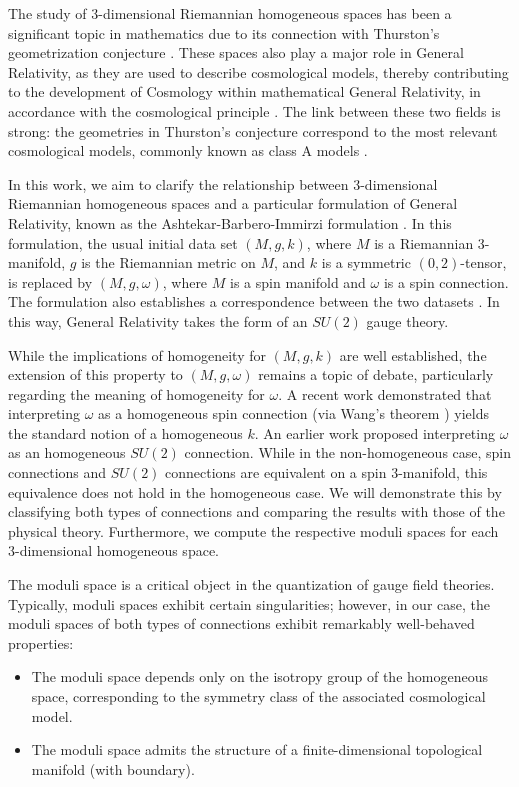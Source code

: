 \documentclass{article}
\numberwithin{equation}{section}
\theoremstyle{definition}
\begin{document}
The study of 3-dimensional Riemannian homogeneous spaces has been a significant topic in mathematics due to its connection with Thurston's geometrization conjecture \cite{Thurston_1982}. These spaces also play a major role in General Relativity, as they are used to describe cosmological models, thereby contributing to the development of Cosmology within mathematical General Relativity, in accordance with the cosmological principle \cite{Landau_Lifshits_1975}. The link between these two fields is strong: the geometries in Thurston's conjecture correspond to the most relevant cosmological models, commonly known as class A models \cite{Milnor_1976,Patrangenaru_1996}.

\medskip

In this work, we aim to clarify the relationship between 3-dimensional Riemannian homogeneous spaces and a particular formulation of General Relativity, known as the Ashtekar-Barbero-Immirzi formulation \cite{Ashtekar_1986,Ashtekar_1987,Barbero_1995,Immirzi_1997}. In this formulation, the usual initial data set $(M, g, k)$, where $M$ is a Riemannian 3-manifold, $g$ is the Riemannian metric on $M$, and $k$ is a symmetric $(0,2)$-tensor, is replaced by $(M, g, \omega)$, where $M$ is a spin manifold and $\omega$ is a spin connection. The formulation also establishes a correspondence between the two datasets \cite{Bruno_2024a}. In this way, General Relativity takes the form of an $SU(2)$ gauge theory.

\medskip

While the implications of homogeneity for $(M, g, k)$ are well established, the extension of this property to $(M, g, \omega)$ remains a topic of debate, particularly regarding the meaning of homogeneity for $\omega$. A recent work \cite{Bruno_2024b} demonstrated that interpreting $\omega$ as a homogeneous spin connection (via Wang's theorem \cite{Wang_1958}) yields the standard notion of a homogeneous $k$. An earlier work \cite{Bojowald_Kastrup_2000} proposed interpreting $\omega$ as an homogeneous $SU(2)$ connection. While in the non-homogeneous case, spin connections and $SU(2)$ connections are equivalent on a spin 3-manifold, this equivalence does not hold in the homogeneous case. We will demonstrate this by classifying both types of connections and comparing the results with those of the physical theory. Furthermore, we compute the respective moduli spaces for each 3-dimensional homogeneous space.

\medskip

The moduli space is a critical object in the quantization of gauge field theories. Typically, moduli spaces exhibit certain singularities; however, in our case, the moduli spaces of both types of connections exhibit remarkably well-behaved properties:
\begin{itemize}
    \item The moduli space depends only on the isotropy group of the homogeneous space, corresponding to the symmetry class of the associated cosmological model.
    \item The moduli space admits the structure of a finite-dimensional topological manifold (with boundary).
\end{itemize}
\end{document}
